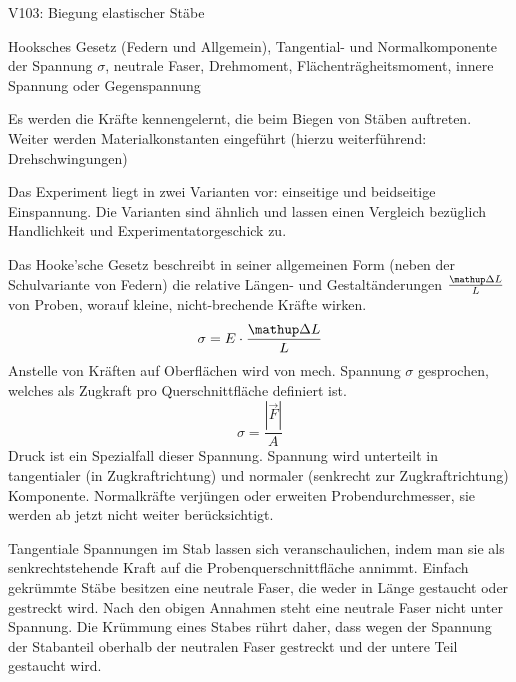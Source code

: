 


    


    \begin{Versuch}{V103: Biegung elastischer Stäbe}
    	\begin{Stichworte}
    		Hooksches Gesetz (Federn und Allgemein), Tangential- und Normalkomponente der Spannung $\sigma$, neutrale Faser, Drehmoment, Flächenträgheitsmoment, innere Spannung oder Gegenspannung
    	\end{Stichworte}

      \begin{Zielsetzung}
        Es werden die Kräfte kennengelernt, die beim Biegen von Stäben auftreten. Weiter werden Materialkonstanten eingeführt (hierzu weiterführend: Drehschwingungen)
      \end{Zielsetzung}

        \begin{Theorie}
            Das Experiment liegt in zwei Varianten vor: 
            einseitige und beidseitige Einspannung. 
            Die Varianten sind ähnlich und lassen einen Vergleich bezüglich Handlichkeit und Experimentatorgeschick zu.

            Das Hooke'sche Gesetz beschreibt in seiner allgemeinen Form 
            (neben der Schulvariante von Federn)
            die relative Längen- und Gestaltänderungen $\frac{\upD L}{L}$ von Proben, 
            worauf kleine, nicht-brechende Kräfte wirken.
            \begin{equation}
            	\sigma = E\cdot\frac{\upD L}{L}
            \end{equation}
            Anstelle von Kräften auf Oberflächen wird von mech.
            Spannung $\sigma$ gesprochen,
            welches als Zugkraft pro Querschnittfläche definiert ist.
            \begin{equation}
            	\sigma=\frac {|\vec {F}|}{A}
            \end{equation}
            Druck ist ein Spezialfall dieser Spannung.
            Spannung wird unterteilt in tangentialer (in Zugkraftrichtung) und normaler (senkrecht zur Zugkraftrichtung) Komponente.
            Normalkräfte verjüngen oder erweiten Probendurchmesser, sie werden ab jetzt nicht weiter berücksichtigt.

            Tangentiale Spannungen im Stab lassen sich veranschaulichen,
            indem man sie als senkrechtstehende Kraft auf die Probenquerschnittfläche annimmt.
            Einfach gekrümmte Stäbe besitzen eine neutrale Faser, 
            die weder in Länge gestaucht oder gestreckt wird.
            Nach den obigen Annahmen steht eine neutrale Faser nicht unter Spannung.
            Die Krümmung eines Stabes rührt daher, dass wegen der Spannung der Stabanteil oberhalb der neutralen Faser gestreckt und der untere Teil gestaucht wird.


\end{Theorie}
\end{Versuch}
